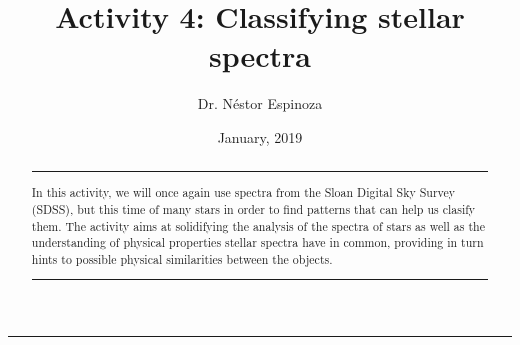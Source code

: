 \documentclass{tufte-handout}
\title{Activity 4: Classifying stellar spectra}
\author[Dr. N\'estor Espinoza]{Dr. N\'estor Espinoza}
\date{January, 2019}  %
\begin{document}
\noindent\textcolor{Red}{\rule{16cm}{3mm}}

{\let\newpage\relax\maketitle}

\begin{abstract}
\noindent\textcolor{Red}{\rule{10cm}{0.4mm}}
\noindent In this activity, we will once again use spectra from the Sloan Digital Sky Survey (SDSS), but this time 
of many stars in order to find patterns that can help us clasify them. The activity aims at solidifying the analysis of 
the spectra of stars as well as the understanding of physical properties stellar spectra have in common, providing in turn 
hints to possible physical similarities between the objects.
\noindent\textcolor{Red}{\rule{10cm}{0.4mm}}
\end{abstract}
\end{document}
